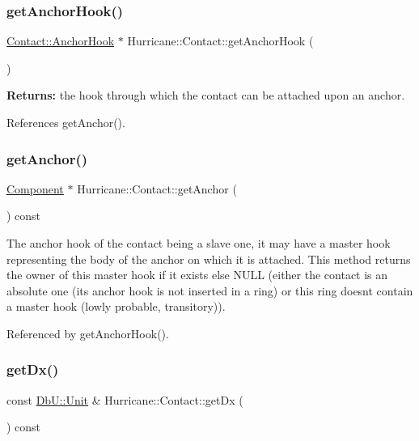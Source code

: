 \subsubsection{\texorpdfstring{get\+Anchor\+Hook()}{getAnchorHook()}}
{\footnotesize\ttfamily \hyperlink{classHurricane_1_1Contact_1_1AnchorHook}{Contact\+::\+Anchor\+Hook} $\ast$ Hurricane\+::\+Contact\+::get\+Anchor\+Hook (\begin{DoxyParamCaption}{ }\end{DoxyParamCaption})\hspace{0.3cm}{\ttfamily [inline]}}

{\bfseries Returns\+:} the hook through which the contact can be attached upon an anchor. 

References get\+Anchor().

\mbox{\label{classHurricane_1_1Contact_ab0b327b306bf7ebda634f59d8d0cfd8f}} 
\subsubsection{\texorpdfstring{get\+Anchor()}{getAnchor()}}
{\footnotesize\ttfamily \hyperlink{classHurricane_1_1Component}{Component} $\ast$ Hurricane\+::\+Contact\+::get\+Anchor (\begin{DoxyParamCaption}{ }\end{DoxyParamCaption}) const}

The anchor hook of the contact being a slave one, it may have a master hook representing the body of the anchor on which it is attached. This method returns the owner of this master hook if it exists else N\+U\+LL (either the contact is an absolute one (its anchor hook is not inserted in a ring) or this ring doesn\textquotesingle{}t contain a master hook (lowly probable, transitory)). 

Referenced by get\+Anchor\+Hook().

\mbox{\label{classHurricane_1_1Contact_acf8405f74b97239ea74ec629d0b4e194}} 
\subsubsection{\texorpdfstring{get\+Dx()}{getDx()}}
{\footnotesize\ttfamily const \hyperlink{group__DbUGroup_ga4fbfa3e8c89347af76c9628ea06c4146}{Db\+U\+::\+Unit} \& Hurricane\+::\+Contact\+::get\+Dx (\begin{DoxyParamCaption}{ }\end{DoxyParamCaption}) const\hspace{0.3cm}{\ttfamily [inline]}}

